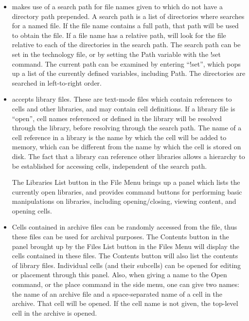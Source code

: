 \begin{itemize}
\item{{\Xic} makes use of a search path for file names given to {\Xic}
    which do not have a directory path prepended.  A search path is a
    list of directories where {\Xic} searches for a named file.  If
    the file name contains a full path, that path will be used to
    obtain the file.  If a file name has a relative path, {\Xic} will
    look for the file relative to each of the directories in the
    search path.  The search path can be set in the technology file,
    or by setting the {\et Path} variable with the {\et !set} command. 
    The current path can be examined by entering ``{\vt !set}'', which
    pops up a list of the currently defined variables, including {\et
    Path}.  The directories are searched in left-to-right order.
}

\item{{\Xic} accepts library files.  These are text-mode files which
    contain references to cells and other libraries, and may contain
    cell definitions.  If a library file is ``open'', cell names
    referenced or defined in the library will be resolved through the
    library, before resolving through the search path.  The name of a
    cell reference in a library is the name by which the cell will be
    added to {\Xic} memory, which can be different from the name by
    which the cell is stored on disk.  The fact that a library can
    reference other libraries allows a hierarchy to be established for
    accessing cells, independent of the search path.

    The {\cb Libraries List} button in the {\cb File Menu} brings up a
    panel which lists the currently open libraries, and provides
    command buttons for performing basic manipulations on libraries,
    including opening/closing, viewing content, and opening cells.
}

\item{Cells contained in archive files can be randomly accessed from
    the file, thus these files can be used for archival purposes.  The
    {\cb Contents} button in the panel brought up by the {\cb Files
    List} button in the {\cb Files Menu} will display the cells
    contained in these files.  The {\cb Contents} button will also
    list the contents of library files.  Individual cells (and their
    subcells) can be opened for editing or placement through this
    panel.  Also, when giving a name to the {\cb Open} command, or the
    {\cb place} command in the side menu, one can give two names:  the
    name of an archive file and a space-separated name of a cell in
    the archive.  That cell will be opened.  If the cell name is not
    given, the top-level cell in the archive is opened.  }
\end{itemize}

